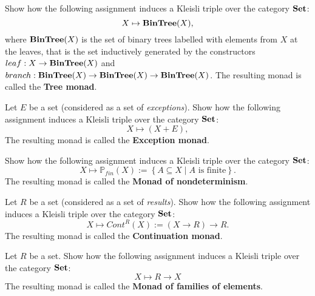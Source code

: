 \begin{exer}\label{exer:kleisli_triple_bintree} Show how the following assignment induces a Kleisli triple over the category $\mathbf{Set}$:
\[
X\mapsto \mathbf{BinTree}(X),
\]
where $\mathbf{BinTree}(X)$ is the set of binary trees labelled with elements from $X$ at the leaves, that is the set inductively generated by the constructors $leaf: X\to \mathbf{BinTree}(X)$ and $branch : \mathbf{BinTree}(X)\to \mathbf{BinTree}(X)\to \mathbf{BinTree}(X)$.
The resulting monad is called the \textbf{Tree monad}.
\end{exer}



\begin{exer}\label{exer:kleisli_triple_maybe} Let $E$ be a set (considered as a set of \textit{exceptions}). Show how the following assignment induces a Kleisli triple over the category $\mathbf{Set}$:
\[
X\mapsto (X + E),
\]
The resulting monad is called the \textbf{Exception monad}.
\end{exer}



\begin{exer}\label{exer:kleisli_triple_nondeterminism} Show how the following assignment induces a Kleisli triple over the category $\mathbf{Set}$:
\[
X\mapsto \mathbb{P}_{fin}(X) := \left\{A\subseteq X \mid  A \text{ is finite}\right\}.
\]
The resulting monad is called the \textbf{Monad of nondeterminism}.
\end{exer}


\begin{exer}\label{exer:kleisli_triple_continuation} Let $R$ be a set (considered as a set of \textit{results}). Show how the following assignment induces a Kleisli triple over the category $\mathbf{Set}$:
\[
X\mapsto Cont^R(X) := (X \to R) \to R.
\]
The resulting monad is called the \textbf{Continuation monad}.
\end{exer}


\begin{exer}\label{exer:kleisli_triple_familiesofelements} Let $R$ be a set. Show how the following assignment induces a Kleisli triple over the category $\mathbf{Set}$: 
\[
X \mapsto R \to X
\]
The resulting monad is called the \textbf{Monad of families of elements}.

\end{exer}




